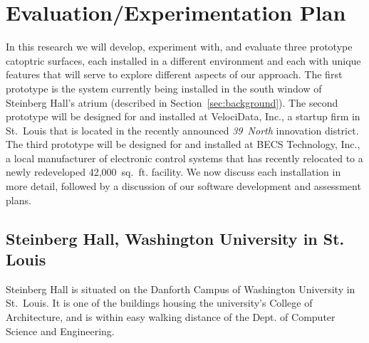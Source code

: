 \section{Evaluation/Experimentation Plan}
\label{sec:eval}


In this research we will develop, experiment with, and evaluate three prototype 
catoptric surfaces, each installed in a different environment and each with
unique features that will serve to explore different aspects of our approach.
The first prototype is the system currently being installed in the south window 
of Steinberg Hall's atrium (described in Section~\ref{sec:background}).
The second prototype will be designed for and installed at VelociData, Inc.,
a startup firm in St.~Louis that is located in the recently announced \emph{39~North}
innovation district.
The third prototype will be designed for and installed at BECS Technology, Inc.,
a local manufacturer of electronic control systems that has recently
relocated to a newly redeveloped 42,000~sq.~ft. facility. We now discuss each
installation in more detail, followed by a discussion of our software development
and assessment plans.

\subsection{Steinberg Hall, Washington University in St. Louis}

Steinberg Hall is situated on the Danforth Campus of Washington University
in St.~Louis. It is one of the buildings housing the university's College 
of Architecture, and is within easy walking distance of the Dept. of
Computer Science and Engineering.

